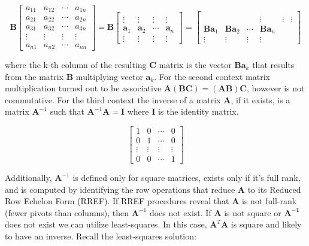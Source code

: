 \documentclass[main.tex]{subfiles}
\begin{document}
    $$
    \mathbf{B}\left[\begin{array}{cccc}
    a_{11} & a_{12} & \cdots & a_{1 n} \\
    a_{21} & a_{22} & \cdots & a_{2 n} \\
    a_{31} & a_{32} & \cdots & a_{3 n} \\
    \vdots & \vdots & \vdots & \vdots \\
    a_{n 1} & a_{n 2} & \cdots & a_{n n}
    \end{array}\right]=\mathbf{B}\left[\begin{array}{cccc} 
    & & & \\
    \vdots & \vdots & \vdots & \vdots \\
    \mathbf{a}_{1} & \mathbf{a}_{2} & \cdots & \mathbf{a}_{n} \\
    \vdots & \vdots & \vdots & \vdots
    \end{array}\right]=\left[\begin{array}{cccc} 
    & & & \\
    & & & \vdots & \vdots & \vdots \\
    \mathbf{B a}_{1} & \mathbf{B a}_{2} & \cdots & \mathbf{B a}_{n} \\
    \vdots & \vdots & \vdots & \vdots
    \end{array}\right]
    $$
    
    where the k-th column of the resulting $\mathbf{C}$ matrix is the vector $\mathbf{B a}_{k}$ that results from the matrix $\mathbf{B}$ multiplying vector $\mathbf{a}_{k}$. For the second context matrix multiplication turned out to be associative $\mathbf{A}(\mathbf{B C})=(\mathbf{A B}) \mathbf{C}$, however is not commutative. For the third context the inverse of a matrix $\mathbf{A}$, if it exists, is a matrix $\mathbf{A}^{-1}$ such that $\mathbf{A}^{-1} \mathbf{A}=\mathbf{I}$ where $\mathbf{I}$ is the identity matrix. 
    
    $$
    \left[\begin{array}{cccc}
    1 & 0 & \cdots & 0 \\
    0 & 1 & \cdots & 0 \\
    \vdots & \vdots & \vdots & \vdots \\
    0 & 0 & \cdots & 1
    \end{array}\right]
    $$
    
    Additionally, $\mathbf{A}^{-1}$ is defined only for square matrices, exists only if it's full rank, and is computed by identifying the row operations that reduce $\mathbf{A}$ to its Reduced Row Echelon Form (RREF). If RREF procedures reveal that $\mathbf{A}$ is not full-rank (fewer pivots than columns), then $\mathbf{A}^{-1}$ does not exist. If $\mathbf{A}$ is not square or $\mathbf{A^{-1}}$ does not exist we can utilize least-squares. In this case, $\mathbf{A}^{T} \mathbf{A}$ is square and likely to have an inverse. Recall the least-squares solution:
    
\end{document}
